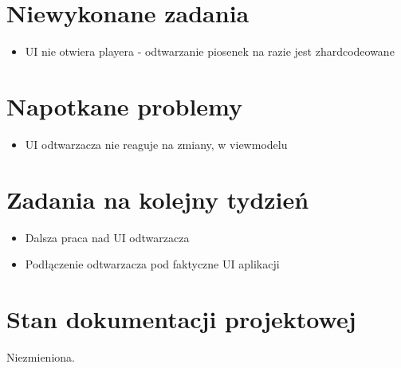 \documentclass[12pt,a4paper]{mwart}
\begin{document}
\section{Niewykonane zadania}

\begin{itemize}
	\item UI nie otwiera playera - odtwarzanie piosenek na razie jest zhardcodeowane
\end{itemize}

\section{Napotkane problemy}

\begin{itemize}
	\item UI odtwarzacza nie reaguje na zmiany, w viewmodelu
\end{itemize}

\section{Zadania na kolejny tydzień}

\begin{itemize}
	\item Dalsza praca nad UI odtwarzacza

	\item Podłączenie odtwarzacza pod faktyczne UI aplikacji
\end{itemize}

\section{Stan dokumentacji projektowej}

Niezmieniona.
\end{document}
